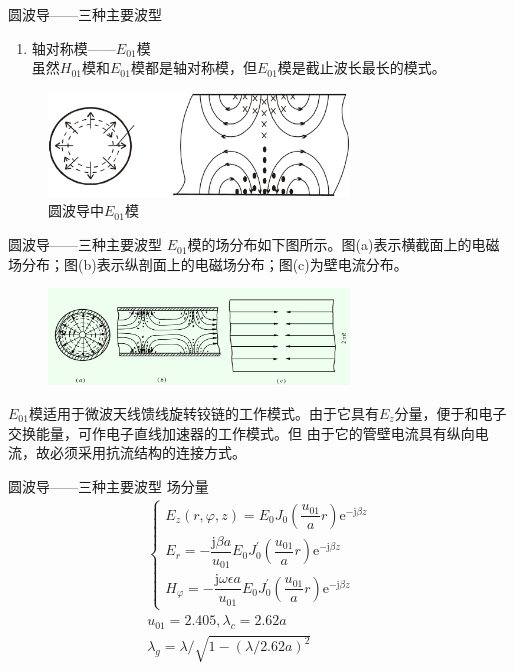 \begin{frame}{圆波导——三种主要波型}
    \begin{enumerate}
        \resume
        \item 轴对称模——$E_{01}$模\\
              虽然$H_{01}$模和$E_{01}$模都是轴对称模，但$E_{01}$模是截止波长最长的模式。
    \end{enumerate}
    \begin{figure}
        \includegraphics[width=8cm]{Cha6//fig6-26.png}
        \caption{圆波导中$E_{01}$模}
    \end{figure}
\end{frame}

\begin{frame}{圆波导——三种主要波型}
    $E_{01}$模的场分布如下图所示。图(a)表示横截面上的电磁场分布；图(b)表示纵剖面上的电磁场分布；图(c)为壁电流分布。
    \begin{figure}
        \includegraphics[width=8cm]{Cha6//fig6-27.png}
    \end{figure}
    $E_{01}$模适用于微波天线馈线旋转铰链的工作模式。由于它具有$E_z$分量，便于和电子交换能量，可作电子直线加速器的工作模式。但
    由于它的管壁电流具有纵向电流，故必须采用抗流结构的连接方式。
\end{frame}

\begin{frame}{圆波导——三种主要波型}
    场分量
    \begin{gather*}
        \begin{cases}
            E_z(r,\varphi,z)=E_0J_0\left(\dfrac{u_{01}}{a}r\right)\mathrm{e}^{-\mathrm{j}\beta z}                          \\
            E_r=-\dfrac{\mathrm{j}\beta a}{u_{01}}E_0J_0^{'}\left(\dfrac{u_{01}}{a}r\right)\mathrm{e}^{-\mathrm{j}\beta z} \\
            H_{\varphi}=-\dfrac{\mathrm{j}\omega\epsilon a}{u_{01}}E_0J_0^{'}\left(\dfrac{u_{01}}{a}r\right)\mathrm{e}^{-\mathrm{j}\beta z}
        \end{cases}\\
        u_{01}=2.405,\lambda_c=2.62a\\
        \lambda_g=\lambda/\sqrt{1-(\lambda/2.62a)^2}
    \end{gather*}
\end{frame}

